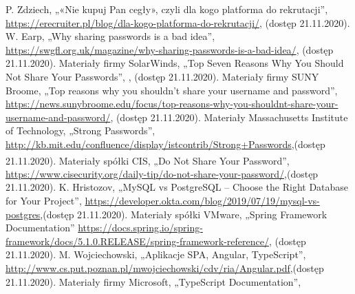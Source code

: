 \documentclass[twoside]{projektInzynierskiMS}
\numberwithin{figure}{section}
\begin{document}
\begin{thebibliography}{12}

 P. Zdziech, „«Nie kupuj Pan cegły», czyli dla kogo platforma do rekrutacji”, \newline \url{https://erecruiter.pl/blog/dla-kogo-platforma-do-rekrutacji/}, \newline(dostęp 21.11.2020).
 W. Earp, „Why sharing passwords is a bad idea”, \newline 
\url{https://swgfl.org.uk/magazine/why-sharing-passwords-is-a-bad-idea/}, (dostęp 21.11.2020).
 Materiały firmy SolarWinds, „Top Seven Reasons Why You Should Not Share Your Passwords”, \newline 
{}, (dostęp 21.11.2020).
 Materiały firmy SUNY Broome, „Top reasons why you shouldn’t share your username and password”, \newline \url{https://news.sunybroome.edu/focus/top-reasons-why-you-shouldnt-share-your-username-and-password/}, (dostęp 21.11.2020).
 Materiały Massachusetts Institute of Technology, „Strong Passwords”, \newline 
\url{http://kb.mit.edu/confluence/display/istcontrib/Strong+Passwords},\newline (dostęp 21.11.2020).
 Materiały spółki CIS\textsuperscript{\textregistered}, „Do Not Share Your Password”, \newline 
\url{https://www.cisecurity.org/daily-tip/do-not-share-your-password/},\newline (dostęp 21.11.2020).
 K. Hristozov, „MySQL vs PostgreSQL -- Choose the Right Database for Your Project”, \newline \url{https://developer.okta.com/blog/2019/07/19/mysql-vs-postgres},\newline (dostęp 21.11.2020).
\newpage
{} Materiały spółki VMware, „Spring Framework Documentation” \newline
\url{https://docs.spring.io/spring-framework/docs/5.1.0.RELEASE/spring-framework-reference/}, (dostęp 21.11.2020).
 M. Wojciechowski, „Aplikacje SPA, Angular, TypeScript”,\newline
\url{http://www.cs.put.poznan.pl/mwojciechowski/cdv/ria/Angular.pdf},\newline (dostęp 21.11.2020).
 Materiały firmy Microsoft, „TypeScript Documentation”,\newline

\end{thebibliography}
\end{document}

